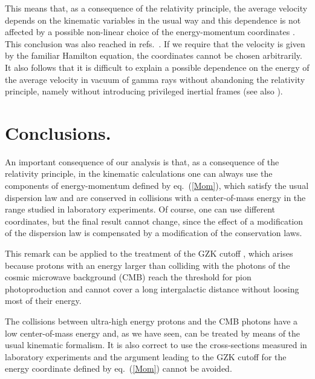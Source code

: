 \documentclass[a4paper,12pt]{article}
\begin{document}
This means that, as a consequence of the relativity principle, the average velocity depends on the kinematic variables \coordHE{} in the usual way and this dependence is not affected by a possible non-linear choice of the energy-momentum coordinates \coordHE{}. This conclusion was also reached in refs.\ \cite{KM,KR}. If we require that the velocity is given by the familiar Hamilton equation, the coordinates \coordHE{} cannot be chosen arbitrarily. It also follows that it is difficult to explain a possible dependence on the energy of the average velocity in vacuum of gamma rays without abandoning the relativity principle, namely without introducing privileged inertial frames (see also \cite{LN2,THMT}).

\section{Conclusions.}

An important consequence of our analysis is that, as a consequence of the relativity principle, in the kinematic calculations one can always use the components of energy-momentum defined by eq.\ (\ref{Mom}), which satisfy the usual dispersion law and are conserved in collisions with a center-of-mass energy in the range studied in laboratory experiments. Of course, one can use different coordinates, but the final result cannot change, since the effect of a modification of the dispersion law is compensated by a modification of the conservation laws.

This remark can be applied to the treatment of the GZK cutoff \cite{ZK,Greisen}, which arises because protons with an energy larger than \coordHE{} colliding with the photons of the cosmic microwave background (CMB) reach the threshold for pion photoproduction and cannot cover a long intergalactic distance without loosing most of their energy.

The collisions between ultra-high energy protons and the CMB photons have a low center-of-mass energy and, as we have seen, can be treated by means of the usual kinematic formalism. It is also correct to use the cross-sections measured in laboratory experiments and the argument leading to the GZK cutoff for the energy coordinate defined by eq.\ (\ref{Mom}) cannot be avoided.
\end{document}
